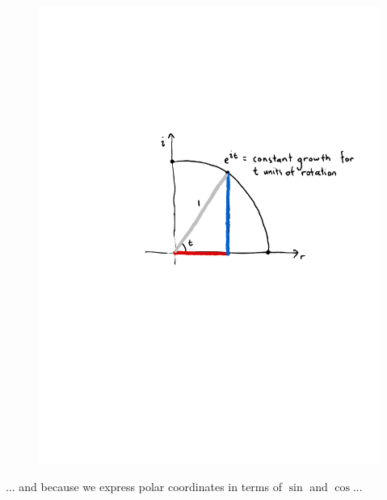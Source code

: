 \documentclass[11pt,serif,aspectratio=169]{beamer}
\begin{document}
	\begin{frame}[c]
		\begin{figure}
			\centering
			\includegraphics[height=0.9\paperheight]{constant-growth-with-e.pdf}	
		\end{figure}
	\end{frame}
	
	\begin{frame}[c]\centering
		... and because we express polar coordinates in terms of $\sin$ and $\cos$...
	\end{frame}
	
\end{document}

